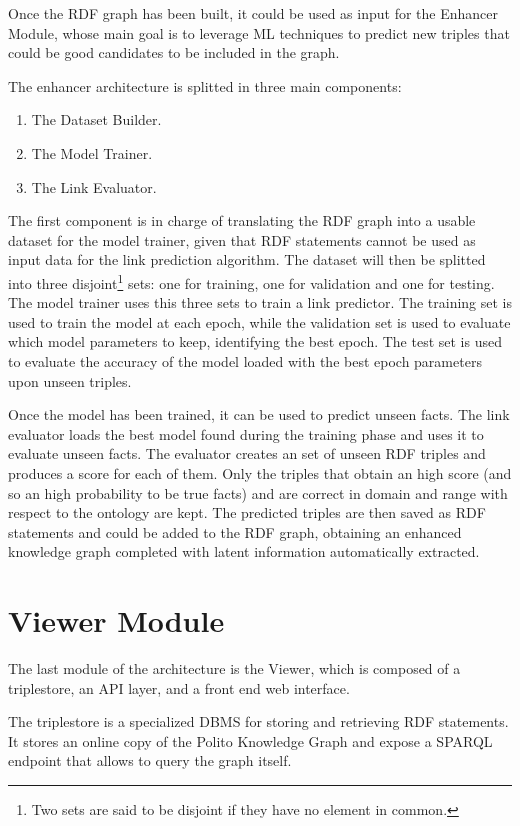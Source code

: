 \documentclass[%
    corpo=13.5pt,
    twoside,
    oldstyle,
    tipotesi=magistrale,
    greek,
    evenboxes
]{toptesi}
\begin{document}
Once the RDF graph has been built, it could be used as input for the Enhancer
Module, whose main goal is to leverage ML techniques to predict new triples
that could be good candidates to be included in the graph.

The enhancer architecture is splitted in three main components:

\begin{enumerate}
    \item The Dataset Builder.
    \item The Model Trainer.
    \item The Link Evaluator.
\end{enumerate}

The first component is in charge of translating the RDF graph into a usable
dataset for the model trainer, given that RDF statements cannot be used as
input data for the link prediction algorithm.
The dataset will then be splitted into three disjoint\footnote{Two sets are said
to be disjoint if they have no element in common.}
sets: one for training, one for validation and one for testing.
The model trainer uses this three sets to train a link predictor. The training
set is used to train the model at each epoch, while the validation set
is used to evaluate which model parameters to keep, identifying the best epoch.
The test set is used to evaluate the accuracy of the model loaded with the best
epoch parameters upon unseen triples.

Once the model has been trained, it can be used to predict unseen facts.
The link evaluator loads the best model found during the training phase and
uses it to evaluate unseen facts.
The evaluator creates an set of unseen RDF triples and produces a score for
each of them. Only the triples that obtain an high score (and so an high
probability to be true facts) and are correct in domain and range with respect
to the ontology are kept.
The predicted triples are then saved as RDF statements and could be added
to the RDF graph, obtaining an enhanced knowledge graph completed with
latent information automatically extracted.

\section{Viewer Module}

The last module of the architecture is the Viewer, which is composed of a
triplestore, an API layer, and a front end web interface.

The triplestore is a specialized DBMS for storing and retrieving RDF
statements.
It stores an online copy of the Polito Knowledge Graph and expose a
SPARQL endpoint that allows to query the graph itself.
\end{document}
